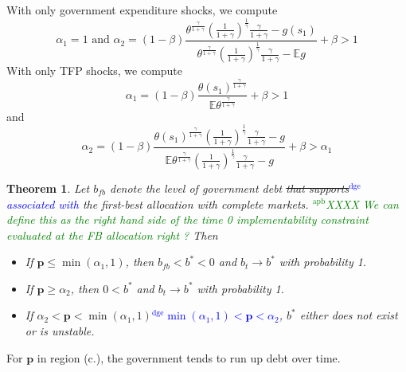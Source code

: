 \documentclass[12pt]{article}
\newcommand{\dge}[1]{\textcolor{blue}{$^{\textrm{dge}}${#1}}}
\newcommand{\apb}[1]{\textcolor{green}{$^{\textrm{apb}}${#1}}}
\newcommand{\EE}{\mathbb E}
\newtheorem{theorem}{Theorem}[section]
\begin{document}
 With only government expenditure shocks, we compute
		\[
			\alpha_1 = 1 \text{  and }  \alpha_2 = (1-\beta)\frac{\theta^\frac{\gamma}{1+\gamma}\left(\frac{1}{1+\gamma}\right)^\frac1\gamma\frac{\gamma}{1+\gamma}-g(s_1)}{\theta^\frac{\gamma}{1+\gamma}\left(\frac{1}{1+\gamma}\right)^\frac1\gamma\frac{\gamma}{1+\gamma}-\EE g} +\beta>1
		\]
		With only TFP shocks, we compute
		\[
			\alpha_1 = (1-\beta)\frac{\theta(s_1)^\frac{\gamma}{1+\gamma}}{\EE\theta^\frac{\gamma}{1+\gamma}}+\beta > 1
		\]and
		\[
		\alpha_2 = (1-\beta)\frac{\theta(s_1)^\frac{\gamma}{1+\gamma}\left(\frac{1}{1+\gamma}\right)^\frac1\gamma\frac{\gamma}{1+\gamma}-g}{\EE\theta^\frac{\gamma}{1+\gamma}\left(\frac{1}{1+\gamma}\right)^\frac1\gamma\frac{\gamma}{1+\gamma}-g}+\beta>\alpha_1
		\]

	

 	\begin{theorem}
Let %
$b_{fb}$ denote the level of  government  debt \st{that  supports}\dge{associated with} the first-best allocation with complete markets.
\apb{XXXX We can define this as the right hand side of the time 0 implementability constraint evaluated at the FB allocation right ?}
Then %
		\begin{itemize}
			\item[a.]  If $\bm{p}\leq\min(\alpha_1,1)$, then  $b_{fb}<b^*<0$ and $b_t\rightarrow b^*$ with probability 1.
			\item[b.] If $\bm{p} \geq \alpha_2$, then   $0<b^*$ and $b_t \rightarrow b^*$ with probability 1.
            \item[c.] If \st{$\alpha_2 < \bm{p} < \min	(\alpha_1,1)$}\dge{$ \min(\alpha_1,1)<\bm{p}<\alpha_2 $},   $b^*$ either does not exist or is unstable.
									\end{itemize}			\end{theorem}
  For $\bm{p}$ in region (c.),
the government tends to run up debt over time.
\end{document}
